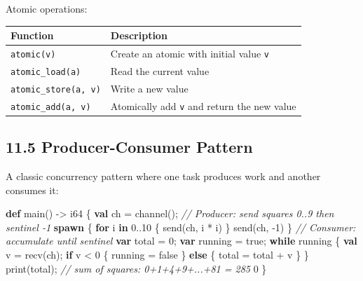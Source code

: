 \documentclass[
  english,
]{book}
\newenvironment{Shaded}{\begin{snugshade}}{\end{snugshade}}
\newcommand{\CommentTok}[1]{\textcolor[rgb]{0.42,0.60,0.33}{\textit{#1}}}
\newcommand{\ConstantTok}[1]{\textcolor[rgb]{0.31,0.76,1.00}{#1}}
\newcommand{\ControlFlowTok}[1]{\textcolor[rgb]{0.77,0.53,0.75}{\textbf{#1}}}
\newcommand{\DataTypeTok}[1]{\textcolor[rgb]{0.31,0.79,0.69}{#1}}
\newcommand{\DecValTok}[1]{\textcolor[rgb]{0.71,0.81,0.66}{#1}}
\newcommand{\FunctionTok}[1]{\textcolor[rgb]{0.86,0.86,0.67}{#1}}
\newcommand{\KeywordTok}[1]{\textcolor[rgb]{0.34,0.61,0.84}{\textbf{#1}}}
\newcommand{\NormalTok}[1]{\textcolor[rgb]{0.83,0.83,0.83}{#1}}
\newcommand{\OperatorTok}[1]{\textcolor[rgb]{0.83,0.83,0.83}{#1}}
\begin{document}
Atomic operations:

\begin{longtable}[]{@{}ll@{}}
\toprule\noalign{}
Function & Description \\
\midrule\noalign{}
\endhead
\bottomrule\noalign{}
\endlastfoot
\texttt{atomic(v)} & Create an atomic with initial value \texttt{v} \\
\texttt{atomic\_load(a)} & Read the current value \\
\texttt{atomic\_store(a,\ v)} & Write a new value \\
\texttt{atomic\_add(a,\ v)} & Atomically add \texttt{v} and return the
new value \\
\end{longtable}

\subsection{11.5 Producer-Consumer
Pattern}\label{producer-consumer-pattern}

A classic concurrency pattern where one task produces work and another
consumes it:

\begin{Shaded}
\begin{Highlighting}[]
\KeywordTok{def}\NormalTok{ main() }\OperatorTok{{-}\textgreater{}} \DataTypeTok{i64}\NormalTok{ \{}
    \KeywordTok{val}\NormalTok{ ch }\OperatorTok{=} \FunctionTok{channel}\NormalTok{();}
    \CommentTok{// Producer: send squares 0..9 then sentinel {-}1}
    \KeywordTok{spawn}\NormalTok{ \{}
        \ControlFlowTok{for}\NormalTok{ i }\ControlFlowTok{in} \DecValTok{0}\OperatorTok{..}\DecValTok{10}\NormalTok{ \{}
            \FunctionTok{send}\NormalTok{(ch, i }\OperatorTok{*}\NormalTok{ i)}
\NormalTok{        \}}
        \FunctionTok{send}\NormalTok{(ch, }\OperatorTok{{-}}\DecValTok{1}\NormalTok{)}
\NormalTok{    \}}
    \CommentTok{// Consumer: accumulate until sentinel}
    \KeywordTok{var}\NormalTok{ total }\OperatorTok{=} \DecValTok{0}\NormalTok{;}
    \KeywordTok{var}\NormalTok{ running }\OperatorTok{=} \ConstantTok{true}\NormalTok{;}
    \ControlFlowTok{while}\NormalTok{ running \{}
        \KeywordTok{val}\NormalTok{ v }\OperatorTok{=} \FunctionTok{recv}\NormalTok{(ch);}
        \ControlFlowTok{if}\NormalTok{ v }\OperatorTok{\textless{}} \DecValTok{0}\NormalTok{ \{}
\NormalTok{            running }\OperatorTok{=} \ConstantTok{false}
\NormalTok{        \} }\ControlFlowTok{else}\NormalTok{ \{}
\NormalTok{            total }\OperatorTok{=}\NormalTok{ total }\OperatorTok{+}\NormalTok{ v}
\NormalTok{        \}}
\NormalTok{    \}}
    \FunctionTok{print}\NormalTok{(total);   }\CommentTok{// sum of squares: 0+1+4+9+...+81 = 285}
    \DecValTok{0}
\NormalTok{\}}
\end{Highlighting}
\end{Shaded}
\end{document}
